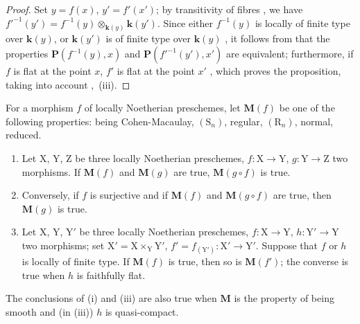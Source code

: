 \begin{proof}
Set $y=f(x)$, $y'=f'(x')$; by transitivity of fibres , we have $f'^{-1}(y')=f^{-1}(y)\otimes_{\boldsymbol{k}(y)}\boldsymbol{k}(y')$. Since either $f^{-1}(y)$ is locally of finite type over $\boldsymbol{k}(y)$, or $\boldsymbol{k}(y')$ is of finite type over $\boldsymbol{k}(y)$ , it follows from  that the properties $\boldsymbol{P}(f^{-1}(y),x)$ and $\boldsymbol{P}(f'^{-1}(y'),x')$ are equivalent; furthermore, if $f$ is flat at the point $x$, $f'$ is flat at the point $x'$ , which proves the proposition, taking into account ,~(iii).
\end{proof}

\begin{proposition}[6.8.3]
\label{IV.6.8.3}
For a morphism $f$ of locally Noetherian preschemes, let $\boldsymbol{M}(f)$ be one of the following properties: being Cohen-Macaulay, $(\mathrm{S}_n)$, regular, $(\mathrm{R}_n)$, normal, reduced.
\begin{enumerate}[label=\textup{(\roman*)}]
  \item Let $\mathrm{X}$, $\mathrm{Y}$, $\mathrm{Z}$ be three locally Noetherian preschemes, $f:\mathrm{X}\to\mathrm{Y}$, $g:\mathrm{Y}\to\mathrm{Z}$ two morphisms. If $\boldsymbol{M}(f)$ and $\boldsymbol{M}(g)$ are true, $\boldsymbol{M}(g\circ f)$ is true.
  \item Conversely, if $f$ is surjective and if $\boldsymbol{M}(f)$ and $\boldsymbol{M}(g\circ f)$ are true, then $\boldsymbol{M}(g)$ is true.
  \item Let $\mathrm{X}$, $\mathrm{Y}$, $\mathrm{Y}'$ be three locally Noetherian preschemes, $f:\mathrm{X}\to\mathrm{Y}$, $h:\mathrm{Y}'\to\mathrm{Y}$ two morphisms; set $\mathrm{X}'=\mathrm{X}\times_\mathrm{Y}\mathrm{Y}'$, $f'=f_{(\mathrm{Y}')}:\mathrm{X}'\to\mathrm{Y}'$. Suppose that $f$ or $h$ is locally of finite type. If $\boldsymbol{M}(f)$ is true, then so is $\boldsymbol{M}(f')$; the converse is true when $h$ is faithfully flat.
\end{enumerate}
The conclusions of \textup{(i)} and \textup{(iii)} are also true when $\boldsymbol{M}$ is the property of being smooth and (in \textup{(iii)}) $h$ is quasi-compact.
\end{proposition}

